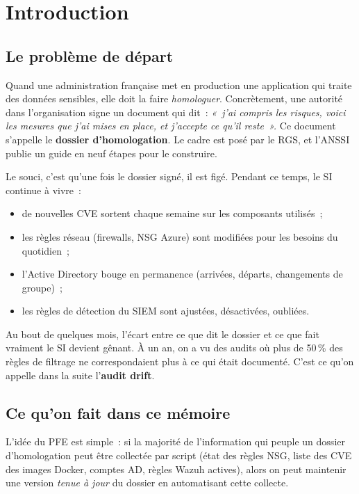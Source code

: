 \chapter{Introduction}
\label{ch:introduction}

\section{Le problème de départ}

Quand une administration française met en production une
application qui traite des données sensibles, elle doit la faire
\emph{homologuer}. Concrètement, une autorité dans l'organisation
signe un document qui dit~: \emph{«~j'ai compris les risques, voici
les mesures que j'ai mises en place, et j'accepte ce qu'il reste~».}
Ce document s'appelle le \textbf{dossier d'homologation}. Le cadre
est posé par le RGS, et l'ANSSI publie un guide en neuf étapes pour
le construire.

Le souci, c'est qu'une fois le dossier signé, il est figé. Pendant
ce temps, le SI continue à vivre~:

\begin{itemize}
  \item de nouvelles CVE sortent chaque semaine sur les composants
        utilisés~;
  \item les règles réseau (firewalls, NSG Azure) sont modifiées
        pour les besoins du quotidien~;
  \item l'Active Directory bouge en permanence (arrivées,
        départs, changements de groupe)~;
  \item les règles de détection du SIEM sont ajustées, désactivées,
        oubliées.
\end{itemize}

Au bout de quelques mois, l'écart entre ce que dit le dossier et
ce que fait vraiment le SI devient gênant. À un an, on a vu des
audits où plus de 50\,\% des règles de filtrage ne correspondaient
plus à ce qui était documenté. C'est ce qu'on appelle dans la
suite l'\textbf{audit drift}.

\section{Ce qu'on fait dans ce mémoire}

L'idée du PFE est simple~: si la majorité de l'information qui
peuple un dossier d'homologation peut être collectée par script
(état des règles NSG, liste des CVE des images Docker, comptes AD,
règles Wazuh actives), alors on peut maintenir une version
\emph{tenue à jour} du dossier en automatisant cette collecte.

